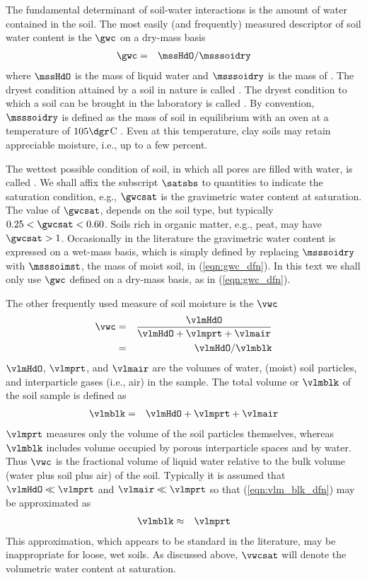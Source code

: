 \documentclass[12pt,twoside]{book}
\begin{document}
The fundamental determinant of soil-water interactions is the amount
of water contained in the soil.
The most easily (and frequently) measured descriptor of soil water
content is the  $\gwc$ on a dry-mass 
basis
\begin{eqnarray}
\gwc & = & \mssHdO / \msssoidry
\label{eqn:gwc_dfn}
\end{eqnarray}
where $\mssHdO$ is the mass of liquid water and $\msssoidry$ is the mass of  
.
The dryest condition attained by a soil in nature is called . 
The dryest condition to which a soil can be brought in the laboratory
is called .
By convention, $\msssoidry$ is defined as the mass of soil in equilibrium
with an oven at a temperature of $105\dgr$C \cite[]{Hil82}.
Even at this temperature, clay soils may retain appreciable moisture,
i.e., up to a few percent.

The wettest possible condition of soil, in which all pores are filled
with water, is called .
We shall affix the subscript $\satsbs$ to quantities to indicate the
saturation condition, e.g., $\gwcsat$ is the gravimetric water content
at saturation.
The value of $\gwcsat$, depends on the soil type, but typically $0.25
< \gwcsat < 0.60$. 
Soils rich in organic matter, e.g., peat, may have $\gwcsat > 1$.
Occasionally in the literature the gravimetric water content is
expressed on a wet-mass basis, which is simply defined by replacing
$\msssoidry$ with $\msssoimst$, the mass of moist soil, in
(\ref{eqn:gwc_dfn}). 
In this text we shall only use $\gwc$ defined on a dry-mass basis, as
in (\ref{eqn:gwc_dfn}).

The other frequently used measure of soil moisture is the
 $\vwc$ 
\begin{eqnarray}
\vwc & = & \frac{\vlmHdO}{\vlmHdO + \vlmprt + \vlmair} \\
& = & \vlmHdO / \vlmblk \nonumber
\label{eqn:vwc_dfn}
\end{eqnarray}
$\vlmHdO$, $\vlmprt$, and $\vlmair$ are the volumes of water, (moist)
soil particles, and interparticle gases (i.e., air) in the sample.
The total volume or  $\vlmblk$ of the soil sample 
is defined as 
\begin{eqnarray}
\vlmblk & = & \vlmHdO + \vlmprt + \vlmair
\label{eqn:vlm_blk_dfn}
\end{eqnarray}
$\vlmprt$ measures only the volume of the soil particles themselves, 
whereas $\vlmblk$ includes volume occupied by porous interparticle
spaces and by water.
Thus $\vwc$ is the fractional volume of liquid water relative to the
bulk volume (water plus soil plus air) of the soil.
Typically it is assumed that $\vlmHdO \ll \vlmprt$ and 
$\vlmair \ll \vlmprt$ so that (\ref{eqn:vlm_blk_dfn}) may be
approximated as 
\begin{eqnarray}
\vlmblk & \approx & \vlmprt
\label{eqn:vlm_blk_apx}
\end{eqnarray}
This approximation, which appears to be standard in the literature,
may be inappropriate for loose, wet soils.
As discussed above, $\vwcsat$ will denote the volumetric water content
at saturation.  
\end{document}
